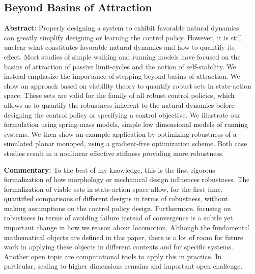 \subsection{Beyond Basins of Attraction}
\textbf{Abstract: }
Properly designing a system to exhibit favorable natural dynamics can greatly simplify designing or learning the control policy. However, it is still unclear what constitutes favorable natural dynamics and how to quantify its effect. Most studies of simple walking and running models have focused on the basins of attraction of passive limit-cycles and the notion of self-stability. We instead emphasize the importance of stepping beyond basins of attraction. We show an approach based on viability theory to quantify robust sets in state-action space. These sets are valid for the family of all robust control policies, which allows us to quantify the robustness inherent to the natural dynamics before designing the control policy or specifying a control objective.
We illustrate our formulation using spring-mass models, simple low dimensional models of running systems. We then show an example application by optimizing robustness of a simulated planar monoped, using a gradient-free optimization scheme. Both case studies result in a nonlinear effective stiffness providing more robustness. \par
\textbf{Commentary: }
To the best of my knowledge, this is the first rigorous formalization of how morphology or mechanical design influences robustness. The formalization of viable sets in state-action space allow, for the first time, quantified comparisons of different designs in terms of robustness, without making assumptions on the control policy design. Furthermore, focusing on robustness in terms of avoiding failure instead of convergence is a subtle yet important change in how we reason about locomotion. Although the fundamental mathematical objects are defined in this paper, there is a lot of room for future work in applying these objects in different contexts and for specific systems. Another open topic are computational tools to apply this in practice. In particular, scaling to higher dimensions remains and important open challenge. %

